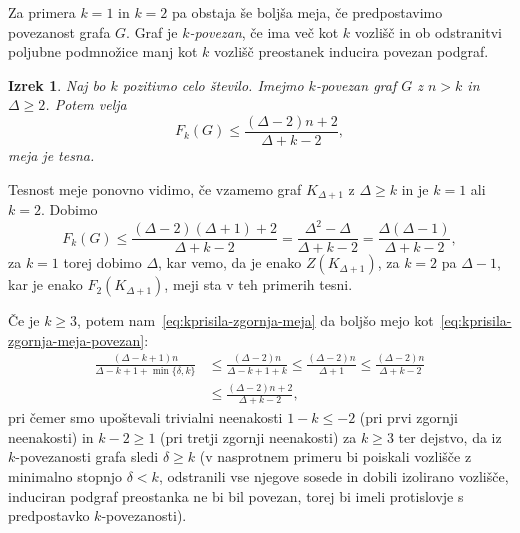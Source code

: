 \documentclass[12pt,a4paper,twoside]{article}
\theoremstyle{definition} %
\theoremstyle{plain} %
\newtheorem{izrek}[definicija]{Izrek}
\numberwithin{equation}{section}  %
\begin{document}
Za primera $k=1$ in $k=2$ pa obstaja še boljša meja, če predpostavimo povezanost grafa $G$. Graf je \emph{$k$-povezan}, če ima več kot $k$ vozlišč in ob odstranitvi poljubne podmnožice manj kot $k$ vozlišč preostanek inducira povezan podgraf.
\begin{izrek}{\cite[izrek 4.4]{amos2015kforcing}}
    Naj bo $k$ pozitivno celo število. Imejmo $k$-povezan graf $G$ z $n > k$ in $\Delta \geq 2$. Potem velja
    \begin{equation}
        \label{eq:kprisila-zgornja-meja-povezan}
        F_k(G) \leq \frac{(\Delta - 2)n + 2}{\Delta + k -2},
    \end{equation}
    meja je tesna.
\end{izrek}
Tesnost meje ponovno vidimo, če vzamemo graf $K_{\Delta + 1}$ z $\Delta \geq k$ in je $k=1$ ali $k=2$. Dobimo
\[  F_k(G) \leq \frac{(\Delta - 2)(\Delta + 1) + 2}{\Delta + k -2} = \frac{\Delta^2 - \Delta}{\Delta + k -2} = \frac{\Delta(\Delta - 1)}{\Delta + k -2}, \]
za $k = 1$ torej dobimo $\Delta$, kar vemo, da je enako $Z(K_{\Delta + 1})$, za $k = 2$ pa $\Delta - 1$, kar je enako $F_2(K_{\Delta + 1})$, meji sta v teh primerih tesni.

Če je $k \geq 3$, potem nam~\eqref{eq:kprisila-zgornja-meja} da boljšo mejo kot~\eqref{eq:kprisila-zgornja-meja-povezan}:
\begin{align*}
\frac{(\Delta - k + 1)n}{\Delta - k + 1 + \min\{\delta,k\}} &\leq \frac{(\Delta - 2)n}{\Delta - k + 1 + k}
\leq \frac{(\Delta - 2)n}{\Delta + 1} \leq \frac{(\Delta - 2)n}{\Delta + k - 2} \\
&\leq \frac{(\Delta - 2)n + 2}{\Delta + k - 2},
\end{align*}
pri čemer smo upoštevali trivialni neenakosti $1 - k \leq -2$ (pri prvi zgornji neenakosti) in $k - 2 \geq 1$ (pri tretji zgornji neenakosti) za $k \geq 3$ ter dejstvo, da iz $k$-povezanosti grafa sledi $\delta \geq k$ (v nasprotnem primeru bi poiskali vozlišče z minimalno stopnjo $\delta < k$, odstranili vse njegove sosede in dobili izolirano vozlišče, induciran podgraf preostanka ne bi bil povezan, torej bi imeli protislovje s predpostavko $k$-povezanosti).
\end{document}
